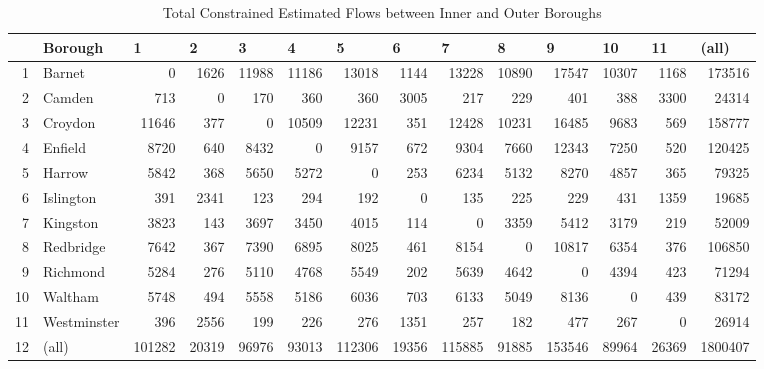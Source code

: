 \documentclass[11pt]{article} %
\begin{document}
\begin{table}
\footnotesize
\caption{Total Constrained Estimated Flows between Inner and Outer Boroughs}
\begin{tabular}{|r|l|r|r|r|r|r|r|r|r|r|r|r|r|}
\hline
\multicolumn{1}{|l|}{} & Borough & \multicolumn{1}{l|}{1} & \multicolumn{1}{l|}{2} & \multicolumn{1}{l|}{3} & \multicolumn{1}{l|}{4} & \multicolumn{1}{l|}{5} & \multicolumn{1}{l|}{6} & \multicolumn{1}{l|}{7} & \multicolumn{1}{l|}{8} & \multicolumn{1}{l|}{9} & \multicolumn{1}{l|}{10} & \multicolumn{1}{l|}{11} & \multicolumn{1}{l|}{(all)} \\ \hline
1 & Barnet & 0 & 1626 & 11988 & 11186 & 13018 & 1144 & 13228 & 10890 & 17547 & 10307 & 1168 & 173516 \\ \hline
2 & Camden & 713 & 0 & 170 & 360 & 360 & 3005 & 217 & 229 & 401 & 388 & 3300 & 24314 \\ \hline
3 & Croydon & 11646 & 377 & 0 & 10509 & 12231 & 351 & 12428 & 10231 & 16485 & 9683 & 569 & 158777 \\ \hline
4 & Enfield & 8720 & 640 & 8432 & 0 & 9157 & 672 & 9304 & 7660 & 12343 & 7250 & 520 & 120425 \\ \hline
5 & Harrow & 5842 & 368 & 5650 & 5272 & 0 & 253 & 6234 & 5132 & 8270 & 4857 & 365 & 79325 \\ \hline
6 & Islington & 391 & 2341 & 123 & 294 & 192 & 0 & 135 & 225 & 229 & 431 & 1359 & 19685 \\ \hline
7 & Kingston & 3823 & 143 & 3697 & 3450 & 4015 & 114 & 0 & 3359 & 5412 & 3179 & 219 & 52009 \\ \hline
8 & Redbridge & 7642 & 367 & 7390 & 6895 & 8025 & 461 & 8154 & 0 & 10817 & 6354 & 376 & 106850 \\ \hline
9 & Richmond & 5284 & 276 & 5110 & 4768 & 5549 & 202 & 5639 & 4642 & 0 & 4394 & 423 & 71294 \\ \hline
10 & Waltham & 5748 & 494 & 5558 & 5186 & 6036 & 703 & 6133 & 5049 & 8136 & 0 & 439 & 83172 \\ \hline
11 & Westminster & 396 & 2556 & 199 & 226 & 276 & 1351 & 257 & 182 & 477 & 267 & 0 & 26914 \\ \hline
12 & (all) & 101282 & 20319 & 96976 & 93013 & 112306 & 19356 & 115885 & 91885 & 153546 & 89964 & 26369 & 1800407 \\ \hline
\end{tabular}
\label{Estimated Flows Total Constrained}
\end{table}


\end{document}
